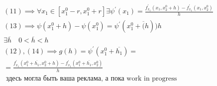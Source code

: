 \documentclass[main]{subfiles}
\begin{document}
\begin{longProof}
\begin{gather*}
                (11) \implies \forall x_1 \in [x_1^0-r,x_1^0+r] \exists \psi^\prime(x_1) =
                \frac{f^\prime_{x_1}(x_1,x_2^0+h)-f^\prime_{x_1}(x_1,x_2^0)}{h} \tag{13}\\
                (13) \implies \psi (x_1^0+h) - \psi(x_1^0) = \psi^\prime(x_1^0+\overline(h))h \tag{14}\\
                \exists \overline{h} \quad 0 < \overline{h} < h \\
                (12),(14) \implies g(h) = \psi^\prime(x_1^0 + \overline{h_1}) = \\ =
                 \frac{f^\prime_{x_1}(x_1^0+\overline{h_1},x_2^0+h)-f^\prime_{x_1}(x_1^0+\overline{h_1},x_2^0)}{h} \tag{15}\\
                 \text{ здесь могла быть ваша реклама, а пока work in progress}
            \end{gather*}
        \end{longProof}
\end{document}
